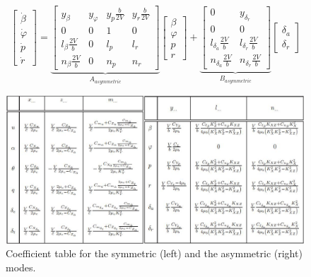 \begin{equation}
\label{eq:lti_asym}
\left[ {\begin{array}{*{20}{c}}
    {\dot \beta } \\ 
    {\dot \varphi } \\ 
    {\dot p} \\ 
    {\dot r} 
\end{array}} \right] = \underbrace {\left[ {\begin{array}{*{20}{c}}
    {{y_\beta }}&{{y_\varphi }}&{{y_p}\tfrac{b}{{2V}}}&{{y_r}\tfrac{b}{{2V}}} \\ 
    0&0&1&0 \\ 
    {{l_\beta }\tfrac{{2V}}{b}}&0&{{l_p}}&{{l_r}} \\ 
    {{n_\beta }\tfrac{{2V}}{b}}&0&{{n_p}}&{{n_r}} 
\end{array}} \right]}_{{A_{asymmetric}}}\left[ {\begin{array}{*{20}{c}}
    \beta  \\ 
    \varphi  \\ 
    p \\ 
    r 
\end{array}} \right] + \underbrace {\left[ {\begin{array}{*{20}{c}}
    0&{{y_{{\delta _r}}}} \\ 
    0&0 \\ 
    {{l_{{\delta _a}}}\tfrac{{2V}}{b}}&{{l_{{\delta _r}}}\tfrac{{2V}}{b}} \\ 
    {{n_{{\delta _a}}}\tfrac{{2V}}{b}}&{{n_{{\delta _r}}}\tfrac{{2V}}{b}} 
\end{array}} \right]}_{{B_{asymmetric}}}\left[ {\begin{array}{*{20}{c}}
    {{\delta _a}} \\ 
    {{\delta _r}} 
\end{array}} \right]
\end{equation}

\begin{figure}
\centering
\includegraphics[width=14cm]{figures/tablecomplete.png}
\caption{Coefficient table for the symmetric (left) and the asymmetric (right) modes\cite{fdreader}.}
\label{fig:completetable}
\end{figure}


